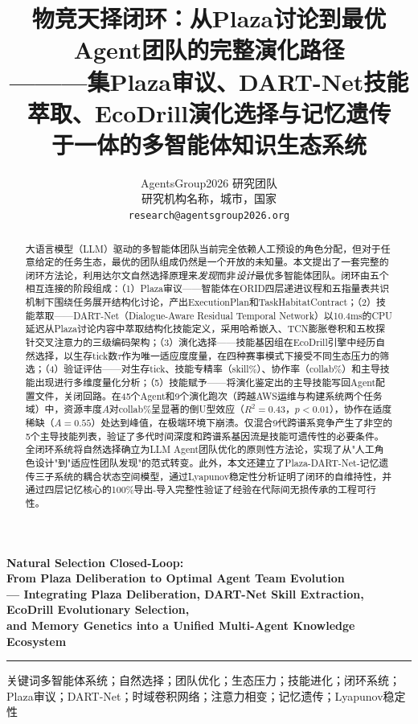 \documentclass[12pt,a4paper]{ctexart}
\title{\zihao{2}\heiti 物竞天择闭环：从Plaza讨论到最优Agent团队的完整演化路径\\
        \vspace{6pt}
        {\zihao{4}\heiti ———集Plaza审议、DART-Net技能萃取、EcoDrill演化选择与记忆遗传\\
        于一体的多智能体知识生态系统}}
\author{
  \zihao{4} AgentsGroup2026 研究团队 \\[4pt]
  \zihao{-5} 研究机构名称，城市，国家 \\[2pt]
  \zihao{-5} \texttt{research@agentsgroup2026.org}
}
\date{}
\begin{document}
\maketitle

\begin{center}
  {\bfseries Natural Selection Closed-Loop:\\
  From Plaza Deliberation to Optimal Agent Team Evolution\\[4pt]
  \kaishu --- Integrating Plaza Deliberation, DART-Net Skill Extraction, EcoDrill Evolutionary Selection,\\
  and Memory Genetics into a Unified Multi-Agent Knowledge Ecosystem}
\end{center}

\vspace{12pt}
\hrule
\vspace{12pt}

\begin{abstract}
{\kaishu
大语言模型（LLM）驱动的多智能体团队当前完全依赖人工预设的角色分配，但对于任意给定的任务生态，最优的团队组成仍然是一个开放的未知量。本文提出了一套完整的闭环方法论，利用达尔文自然选择原理来\emph{发现}而非\emph{设计}最优多智能体团队。闭环由五个相互连接的阶段组成：（1）Plaza审议——智能体在ORID四层递进议程和五指量表共识机制下围绕任务展开结构化讨论，产出ExecutionPlan和TaskHabitatContract；（2）技能萃取——DART-Net（Dialogue-Aware Residual Temporal Network）以10.4ms的CPU延迟从Plaza讨论内容中萃取结构化技能定义，采用哈希嵌入、TCN膨胀卷积和五枚探针交叉注意力的三级编码架构；（3）演化选择——技能基因组在EcoDrill引擎中经历自然选择，以生存tick数$\tau$作为唯一适应度度量，在四种赛事模式下接受不同生态压力的筛选；（4）验证评估——对生存tick、技能专精率（skill\%）、协作率（collab\%）和主导技能出现进行多维度量化分析；（5）技能赋予——将演化鉴定出的主导技能写回Agent配置文件，关闭回路。在45个Agent和9个演化跑次（跨越AWS运维与构建系统两个任务域）中，资源丰度$A$对collab\%呈显著的倒U型效应（$R^2=0.43$，$p<0.01$），协作在适度稀缺（$A=0.55$）处达到峰值，在极端环境下崩溃。仅混合9代跨谱系竞争产生了非空的5个主导技能列表，验证了多代时间深度和跨谱系基因流是技能可遗传性的必要条件。全闭环系统将自然选择确立为LLM Agent团队优化的原则性方法论，实现了从"人工角色设计"到"适应性团队发现"的范式转变。此外，本文还建立了Plaza-DART-Net-记忆遗传三子系统的耦合状态空间模型，通过Lyapunov稳定性分析证明了闭环的自维持性，并通过四层记忆核心的100\%导出-导入完整性验证了经验在代际间无损传承的工程可行性。
}
\end{abstract}

\vspace{6pt}
{\heiti 关键词\quad}{\kaishu 多智能体系统；自然选择；团队优化；生态压力；技能进化；闭环系统；Plaza审议；DART-Net；时域卷积网络；注意力相变；记忆遗传；Lyapunov稳定性}
\end{document}
